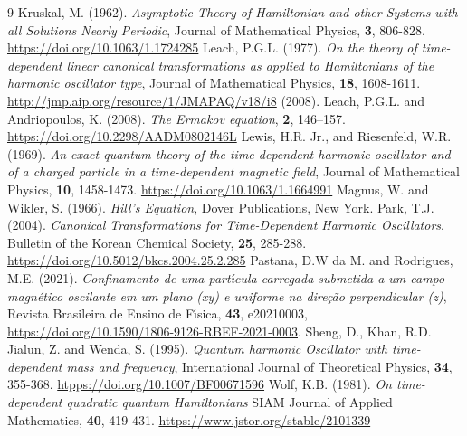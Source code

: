 \documentclass[12pt]{article}
\numberwithin{equation}{section}
\begin{document}
\begin{thebibliography}{9}
 Kruskal, M. (1962). {\it Asymptotic Theory of Hamiltonian and other Systems with all Solutions Nearly Periodic}, Journal of Mathematical Physics, \textbf{3}, 806-828. \url{
https://doi.org/10.1063/1.1724285}
 Leach, P.G.L. (1977). {\it On the theory of time-dependent linear canonical transformations as applied to Hamiltonians of the harmonic oscillator type}, Journal of Mathematical Physics, \textbf{18}, 1608-1611. \url{http://jmp.aip.org/resource/1/JMAPAQ/v18/i8}
 (2008). Leach, P.G.L. and Andriopoulos, K. (2008).  {\it The Ermakov equation}, \textbf{2}, 146–157. \url{https://doi.org/10.2298/AADM0802146L}
 Lewis, H.R. Jr., and Riesenfeld, W.R. (1969). {\it An exact quantum theory of the time-dependent harmonic oscillator and of a charged particle in a time-dependent magnetic field}, Journal of Mathematical Physics, \textbf{10}, 1458-1473. \url{https://doi.org/10.1063/1.1664991}
 Magnus, W. and Wikler, S. (1966). {\it Hill's Equation}, Dover Publications, New York.
 Park, T.J. (2004). {\it Canonical Transformations for Time-Dependent Harmonic Oscillators}, Bulletin of the Korean Chemical Society, \textbf{25},  285-288. \url{https://doi.org/10.5012/bkcs.2004.25.2.285}
 Pastana, D.W da M. and Rodrigues, M.E. (2021). {\it Confinamento de uma part\'{ı}cula carregada submetida a um campo magn\'etico oscilante em um plano (xy) e uniforme na dire\c{c}\~{a}o perpendicular (z)}, Revista Brasileira de Ensino de F\'{ı}sica, \textbf{43}, e20210003, \url{https://doi.org/10.1590/1806-9126-RBEF-2021-0003}.
 Sheng, D., Khan, R.D. Jialun, Z. and Wenda, S. (1995). {\it Quantum harmonic Oscillator with time-dependent mass and frequency},  International Journal of Theoretical Physics, \textbf{34}, 355-368. \url{htpps://doi.org/10.1007/BF00671596}
 Wolf, K.B. (1981). {\it On time-dependent quadratic quantum Hamiltonians} 
SIAM Journal of Applied Mathematics, \textbf{40}, 419-431. \url{https://www.jstor.org/stable/2101339 }

\end{thebibliography}
\end{document}
